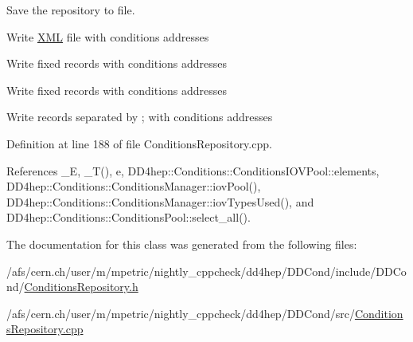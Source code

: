 Save the repository to file. 

Write \hyperlink{namespace_d_d4hep_1_1_x_m_l}{X\+ML} file with conditions addresses

Write fixed records with conditions addresses

Write fixed records with conditions addresses

Write records separated by \textquotesingle{};\textquotesingle{} with conditions addresses 

Definition at line 188 of file Conditions\+Repository.\+cpp.



References \+\_\+E, \+\_\+\+T(), e, D\+D4hep\+::\+Conditions\+::\+Conditions\+I\+O\+V\+Pool\+::elements, D\+D4hep\+::\+Conditions\+::\+Conditions\+Manager\+::iov\+Pool(), D\+D4hep\+::\+Conditions\+::\+Conditions\+Manager\+::iov\+Types\+Used(), and D\+D4hep\+::\+Conditions\+::\+Conditions\+Pool\+::select\+\_\+all().



The documentation for this class was generated from the following files\+:\begin{DoxyCompactItemize}
\item 
/afs/cern.\+ch/user/m/mpetric/nightly\+\_\+cppcheck/dd4hep/\+D\+D\+Cond/include/\+D\+D\+Cond/\hyperlink{_conditions_repository_8h}{Conditions\+Repository.\+h}\item 
/afs/cern.\+ch/user/m/mpetric/nightly\+\_\+cppcheck/dd4hep/\+D\+D\+Cond/src/\hyperlink{_conditions_repository_8cpp}{Conditions\+Repository.\+cpp}\end{DoxyCompactItemize}
